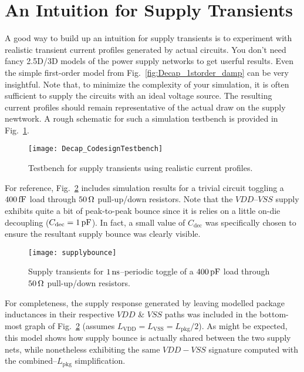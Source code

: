 \section{An Intuition for Supply Transients}
\par A good way to build up an intuition for supply transients is to experiment
with realistic transient current profiles generated by actual circuits. You don't
need fancy 2.5D/3D models of the power supply networks to get userful results.
Even the simple first-order model from Fig.~\ref{fig:Decap_1storder_damp} can be
very insightful.  Note that, to minimize the complexity of your simulation, it
is often sufficient to supply the circuits with an ideal voltage source. The
resulting current profiles should remain representative of the actual draw on
the supply newtwork. A rough schematic for such a simulation testbench is
provided in Fig.~\ref{fig:Testbench_SupplyTransient}.
%
\begin{figure}[!ht]
	\centering
	\texttt{[image: Decap\_CodesignTestbench]}
	\caption{Testbench for supply transients using realistic current profiles.}
\label{fig:Testbench_SupplyTransient}%
\end{figure}
%
\par For reference, Fig.~\ref{fig:Supplybounce} includes simulation results for
a trivial circuit toggling a $400\mathrm{\,fF}$ load through $50\mathrm{\,\Omega}$ pull-up/down
resistors. Note that the $VDD$--$VSS$ supply exhibits quite a bit of
peak-to-peak bounce since it is relies on a little on-die decoupling
($C_\mathrm{dec}=1\mathrm{\,pF}$). In fact, a small value of $C_\mathrm{dec}$ was
specifically chosen to ensure the resultant supply bounce was clearly visible.
%
\begin{figure}[!ht]
	\centering
	\texttt{[image: supplybounce]}
	\caption{Supply transients for $1\mathrm{\,ns}$--periodic toggle of a $400\mathrm{\,pF}$ load through $50\mathrm{\,\Omega}$ pull-up/down resistors.}
\label{fig:Supplybounce}%
\end{figure}
%
\par For completeness, the supply response generated by leaving modelled
package inductances in their respective $VDD$ \& $VSS$ paths was included in the
bottom-most graph of Fig.~\ref{fig:Supplybounce} (assumes
$L_\mathrm{VDD}=L_\mathrm{VSS}=L_\mathrm{pkg}/2$). As might be expected, this
model shows how supply bounce is actually shared between the two supply nets,
while nonetheless exhibiting the same $VDD-VSS$ signature computed with the
combined--$L_\mathrm{pkg}$ simplification.
%
